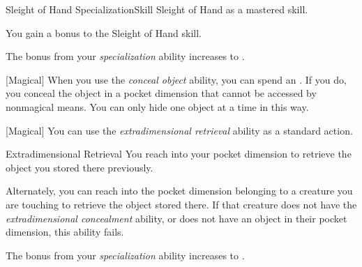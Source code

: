     \begin{feat}{Sleight of Hand Specialization}{Skill}
        \featpre Sleight of Hand as a mastered skill.

         You gain a  bonus to the Sleight of Hand skill.

        \ff[4]{}

         The bonus from your \textit{specialization} ability increases to .

        [Magical] When you use the \textit{conceal object} ability, you can spend an .
        If you do, you conceal the object in a pocket dimension that cannot be accessed by nonmagical means.
        You can only hide one object at a time in this way.

        [Magical] You can use the \textit{extradimensional retrieval} ability as a standard action.
        \begin{apability}{Extradimensional Retrieval}
            You reach into your pocket dimension to retrieve the object you stored there previously.

            Alternately, you can reach into the pocket dimension belonging to a creature you are touching to retrieve the object stored there.
            If that creature does not have the \textit{extradimensional concealment} ability, or does not have an object in their pocket dimension, this ability fails.
        \end{apability}

         The bonus from your \textit{specialization} ability increases to .
    \end{feat}

